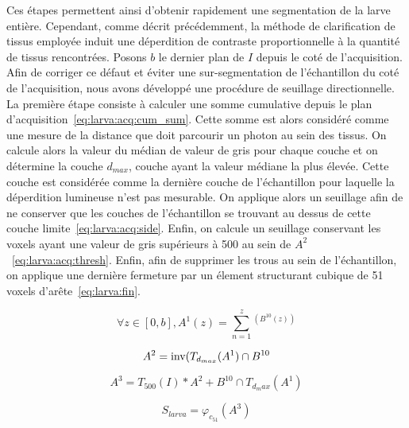 \documentclass[\main/main.tex]{subfiles}
\begin{document}
%
Ces étapes permettent ainsi d'obtenir rapidement une segmentation de la larve entière.
%
Cependant, comme décrit précédemment,
la méthode de clarification de tissus employée induit une déperdition de contraste proportionnelle à la quantité de tissus rencontrées.
%
Posons $b$ le dernier plan de $I$ depuis le coté de l'acquisition.
%
Afin de corriger ce défaut et éviter une sur-segmentation de l'échantillon du coté de l'acquisition, nous avons développé une procédure de seuillage directionnelle.
%
La première étape consiste à calculer une somme cumulative depuis le plan d'acquisition~\eqref{eq:larva:acq:cum_sum}.
%
Cette somme est alors considéré comme une mesure de la distance que doit parcourir un photon au sein des tissus.
%
On calcule alors la valeur du médian de valeur de gris pour chaque couche et on détermine la couche $d_{max}$, couche ayant la valeur médiane la plus élevée.
%
Cette couche est considérée comme la dernière couche de l'échantillon pour laquelle la déperdition lumineuse n'est pas mesurable.
%
On applique alors un seuillage afin de ne conserver que les couches de l'échantillon se trouvant au dessus de cette couche limite~\eqref{eq:larva:acq:side}.
%
Enfin, on calcule un seuillage conservant les voxels ayant une valeur de gris supérieurs à 500 au sein de $A^2$~\eqref{eq:larva:acq:thresh}.
%
Enfin, afin de supprimer les trous au sein de l'échantillon, on applique une dernière fermeture par un élement structurant cubique de 51 voxels d'arête~\eqref{eq:larva:fin}.

\begin{equation}
    \label{eq:larva:acq:cum_sum}
        \forall z \in [0,b], A^1(z)=\sum_{n=1}^{z}^(B^{10}(z))
\end{equation}

\begin{equation}
    \label{eq:larva:acq:side}
    A^2 = \operatorname{\textnormal{inv}}(T_{d_{max}}(A^1) \cap B^{10}
\end{equation}

\begin{equation}
    \label{eq:larva:acq:thresh}
    A^3 = T_{500}(I) * A^2 + B^{10} \cap T_{d_max}(A^1)
\end{equation}

\begin{equation}
    \label{eq:larva:fin}
    S_{larva} = \varphi_{c_{51}}(A^3)
\end{equation}
\end{document}
